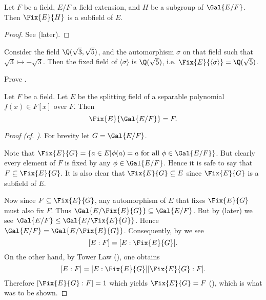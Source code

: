 \begin{proposition}\label{prop-fixed-field-is-subfield}
    Let $F$ be a field, $E/F$ a field extension, and $H$ be a subgroup of $\Gal{E/F}$. Then $\Fix{E}{H}$ is a subfield of $E$.
\end{proposition}
\begin{proof}
    See  (later).
\end{proof}

\begin{example}
    Consider the field $\Q(\sqrt3,\sqrt5)$, and the automorphism $\sigma$ on that field such that $\sqrt3 \mapsto -\sqrt3$. Then the fixed field of $\langle\sigma\rangle$ is $\Q(\sqrt5)$, i.e. $\Fix{E}{\langle\sigma\rangle} = \Q(\sqrt5)$.
\end{example}

\begin{exercise}\label{exercise-fixed-field-is-subfield}
    Prove .
\end{exercise}

\begin{proposition}\label{prop-fixed-field-of-Gal-E/F-is-F}
    Let $F$ be a field. Let $E$ be the splitting field of a separable polynomial $f(x) \in F[x]$ over $F$. Then
    \[
        \Fix{E}{\Gal{E/F}} = F.
    \]
\end{proposition}
\begin{proof}[Proof (cf. {\cite[Proposition 23.17]{judson_beezer_2022}})]
    For brevity let $G = \Gal{E/F}$.
    
    Note that $\Fix{E}{G} = \{a \in E \vert \phi(a) = a \text{ for all } \phi \in \Gal{E/F}\}$. But clearly every element of $F$ is fixed by any $\phi \in \Gal{E/F}$. Hence it is safe to say that $F \subseteq \Fix{E}{G}$. It is also clear that $\Fix{E}{G} \subseteq E$ since $\Fix{E}{G}$ is a subfield of $E$.

    Now since $F \subseteq \Fix{E}{G}$, any automorphism of $E$ that fixes $\Fix{E}{G}$ must also fix $F$. Thus $\Gal{E/\Fix{E}{G}} \subseteq \Gal{E/F}$. But by  (later) we see $\Gal{E/F} \leq \Gal{E/\Fix{E}{G}}$. Hence $\Gal{E/F} = \Gal{E/\Fix{E}{G}}$. Consequently, by  we see
    \[
        [E:F] = [E:\Fix{E}{G}].
    \]
    On the other hand, by Tower Law (), one obtains
    \[
        [E:F] = [E:\Fix{E}{G}][\Fix{E}{G}:F].
    \]
    Therefore $[\Fix{E}{G}:F] = 1$ which yields $\Fix{E}{G} = F$ (), which is what was to be shown.
\end{proof}

